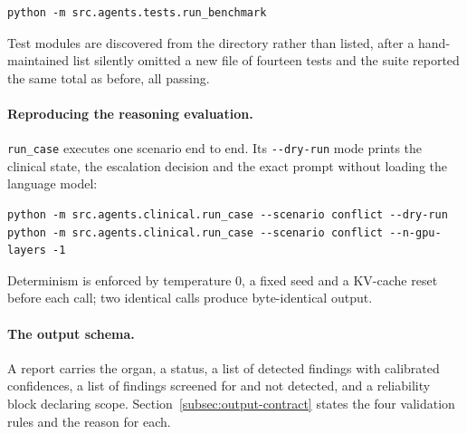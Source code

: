 \begin{verbatim}
python -m src.agents.tests.run_benchmark
\end{verbatim}

Test modules are discovered from the directory rather than listed, after a hand-maintained list
silently omitted a new file of fourteen tests and the suite reported the same total as before,
all passing.

\paragraph{Reproducing the reasoning evaluation.} \texttt{run\_case} executes one scenario end
to end. Its \texttt{-{}-dry-run} mode prints the clinical state, the escalation decision and the
exact prompt without loading the language model:

\begin{verbatim}
python -m src.agents.clinical.run_case --scenario conflict --dry-run
python -m src.agents.clinical.run_case --scenario conflict --n-gpu-layers -1
\end{verbatim}

Determinism is enforced by temperature 0, a fixed seed and a KV-cache reset before each call;
two identical calls produce byte-identical output.

\paragraph{The output schema.} A report carries the organ, a status, a list of detected findings
with calibrated confidences, a list of findings screened for and not detected, and a reliability
block declaring scope. Section~\ref{subsec:output-contract} states the four validation rules and
the reason for each.

